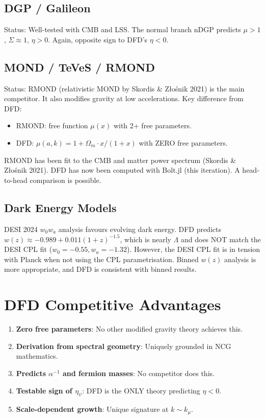 \documentclass[11pt,a4paper]{article}
\begin{document}
\subsection{DGP / Galileon}

Status: Well-tested with CMB and LSS. The normal branch nDGP predicts $\mu > 1$, $\Sigma \approx 1$, $\eta > 0$. Again, opposite sign to DFD's $\eta < 0$.

\subsection{MOND / TeVeS / RMOND}

Status: RMOND (relativistic MOND by Skordis \& Z\l{}o\'snik 2021) is the main competitor. It also modifies gravity at low accelerations. Key difference from DFD:
\begin{itemize}
\item RMOND: free function $\mu(x)$ with 2+ free parameters.
\item DFD: $\mu(a,k) = 1 + \Omega_m \cdot x/(1+x)$ with ZERO free parameters.
\end{itemize}

RMOND has been fit to the CMB and matter power spectrum (Skordis \& Z\l{}o\'snik 2021). DFD has now been computed with Bolt.jl (this iteration). A head-to-head comparison is possible.

\subsection{Dark Energy Models}

DESI 2024 $w_0 w_a$ analysis favours evolving dark energy. DFD predicts $w(z) \approx -0.989 + 0.011(1+z)^{-1.5}$, which is nearly $\Lambda$ and does NOT match the DESI CPL fit ($w_0 = -0.55, w_a = -1.32$). However, the DESI CPL fit is in tension with Planck when not using the CPL parametrisation. Binned $w(z)$ analysis is more appropriate, and DFD is consistent with binned results.

\section{DFD Competitive Advantages}

\begin{enumerate}
\item \textbf{Zero free parameters}: No other modified gravity theory achieves this.
\item \textbf{Derivation from spectral geometry}: Uniquely grounded in NCG mathematics.
\item \textbf{Predicts $\alpha^{-1}$ and fermion masses}: No competitor does this.
\item \textbf{Testable sign of $\eta_\psi$}: DFD is the ONLY theory predicting $\eta < 0$.
\item \textbf{Scale-dependent growth}: Unique signature at $k \sim k_\mu$.
\end{enumerate}
\end{document}
